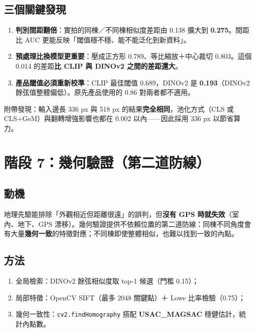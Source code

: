 \documentclass[11pt,a4paper,fontset=windows]{ctexart}
\begin{document}
\subsection{三個關鍵發現}
\begin{enumerate}[leftmargin=1.4em,itemsep=2pt]
  \item \textbf{判別間距翻倍}：實拍的同棟／不同棟相似度差距由 0.138 擴大到 \textbf{0.275}。間距比 AUC 更能反映「閾值穩不穩、能不能泛化到新資料」。
  \item \textbf{預處理比換模型更重要}：壓成正方形 0.789、等比縮放＋中心裁切 0.803。這個 0.014 的差距\textbf{比 CLIP 與 DINOv2 之間的差距還大}。
  \item \textbf{產品閾值必須重新校準}：CLIP 最佳閾值 0.689，DINOv2 是 \textbf{0.193}（DINOv2 餘弦值整體偏低）。原先產品使用的 0.86 對兩者都不適用。
\end{enumerate}

\noindent 附帶發現：輸入邊長 336 px 與 518 px 的結果\textbf{完全相同}，池化方式（CLS 或 CLS+GeM）與翻轉增強影響也都在 0.002 以內——因此採用 336 px 以節省算力。

\section{階段 7：幾何驗證（第二道防線）}

\subsection{動機}
地理先驗能排除「外觀相近但距離很遠」的誤判，但\textbf{沒有 GPS 時就失效}（室內、地下、GPS 漂移）。幾何驗證提供不依賴位置的第二道防線：同棟不同角度會有大量\textbf{幾何一致}的特徵對應；不同棟即使整體相似，也難以找到一致的內點。

\subsection{方法}
\begin{enumerate}[leftmargin=1.4em,itemsep=1pt]
  \item 全局檢索：DINOv2 餘弦相似度取 top-1 候選（門檻 0.15）；
  \item 局部特徵：OpenCV SIFT（最多 2048 關鍵點）＋ Lowe 比率檢驗（0.75）；
  \item 幾何一致性：\texttt{cv2.findHomography} 搭配 \textbf{USAC\_MAGSAC} 穩健估計，統計內點數。
\end{enumerate}
\end{document}
